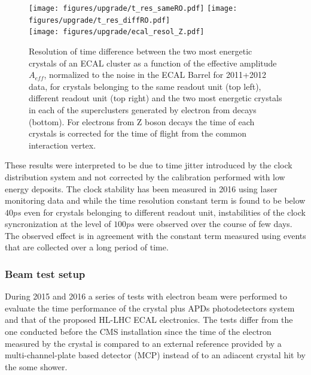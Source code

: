 \begin{figure}[h!]
  \centering
  \texttt{[image: figures/upgrade/t\_res\_sameRO.pdf]}
  \texttt{[image: figures/upgrade/t\_res\_diffRO.pdf]}\\
  \texttt{[image: figures/upgrade/ecal\_resol\_Z.pdf]}
  \caption{Resolution of time difference between the two most energetic crystals of an ECAL cluster as a function of the
    effective amplitude $A_{eff}$, normalized to the noise in the ECAL Barrel for 2011+2012 data,
    for crystals belonging to the same readout unit (top left), different readout unit (top right) and the two most
    energetic crystals in each of the superclusters generated by electron from \Zee decays (bottom).
    For electrons from Z boson decays the time of each crystals is corrected for the time of flight from the common
  interaction vertex.}
  \label{fig:ecal_runI_time}
\end{figure}

These results were interpreted to be due to time jitter introduced by the clock distribution system and not corrected by
the calibration performed with low energy deposits. The clock stability has been measured in 2016 using laser monitoring data
and while the time resolution constant term is found to be below $40 ps$ even for crystals belonging to different readout unit,
instabilities of the clock syncronization at the level of $100 ps$ were observed over the course of few days. The
observed effect is in agreement with the constant term measured using \Zee events that are collected over a long period of time.

\subsubsection{Beam test setup}
\label{sec:tb_2015}
During 2015 and 2016 a series of tests with electron beam were performed to evaluate the time performance
of the \PbWO crystal plus APDs photodetectors system and that of the proposed HL-LHC ECAL electronics.
The tests differ from the one conducted before the CMS installation since the time of the electron measured by the
crystal is compared to an external reference provided by a multi-channel-plate based detector (MCP) instead of to an adiacent
crystal hit by the some shower.

